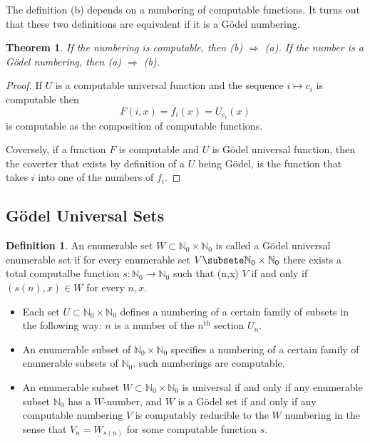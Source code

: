 \documentclass[10pt, letterpaper]{article}
\newcommand{\N}{\mathbb{N}}
\newtheorem{thm}{Theorem}
\theoremstyle{remark}
\theoremstyle{definition}
\newtheorem{defn}{Definition}
\begin{document}
The definition (b) depends on a numbering of computable functions. It turns out that these two definitions are 
equivalent if it is a G\"{o}del numbering.

\begin{thm}
    If the numbering is computable, then (b) $\Rightarrow$ (a). If the number is a G\"{o}del numbering, then (a) $\Rightarrow$ (b).
\end{thm}

\begin{proof}
    If $U$ is a computable universal function and the sequence $i \mapsto c_i$ is computable then 
    \[
        F(i,x) = f_i(x) = U_{c_i}(x)
    \]
    is computable as the composition of computable functions.

    Coversely, if a function $F$ is computable and $U$ is G\"{o}del universal function, then the coverter that 
    exists by definition of a $U$ being G\"{o}del, is the function that takes $i$ into one of the numbers of $f_i$.
\end{proof}

\subsection*{G\"{o}del Universal Sets}

\begin{defn}
    An enumerable set $W \subset \N_0 \times \N_0$ is called a G\"{o}del universal enumerable set if for every enumerable set 
$V \subsete \N_0 \times \N_0$ there exists a total computalbe function $s:\N_0 \rightarrow \N_0$ such that 
(n,x) \in $V$ if and only if $(s(n), x) \in W$ for every $n,x$.
\end{defn}

\begin{itemize}
    \item Each set $U \subset \N_0 \times \N_0$ defines a numbering of a certain family of subsets in the following way: $n$ is a number 
of the $n^{\text{th}}$ section $U_n$.
    \item An enumerable subset of $\N_0 \times \N_0$ specifies a numbering of a certain family of enumerable subsets of $\N_0$.
    such numberings are computable.
    \item An enumerable subset $W \subset \N_0 \times \N_0$ is universal if and only if any enumerable subset $\N_0$ has a $W$-number, and $W$ is 
    a G\"{o}del set if and only if any computable numbering $V$ is computably reducible to the $W$ numbering in the sense that 
    $V_n = W_{s(n)}$ for some computable function $s$.
\end{itemize}
\end{document}
